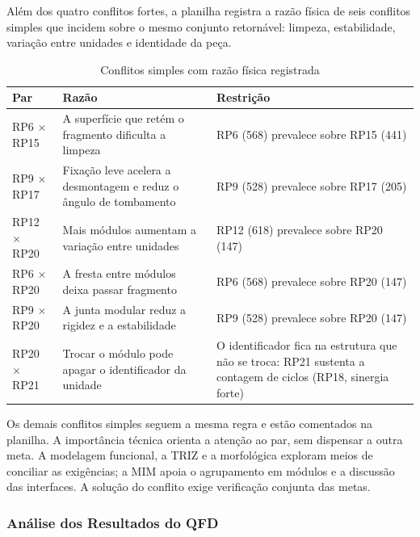 Além dos quatro conflitos fortes, a planilha registra a razão física de seis conflitos simples que incidem sobre o mesmo conjunto retornável: limpeza, estabilidade, variação entre unidades e identidade da peça.


\begin{table}[H]
\caption{Conflitos simples com razão física registrada}
\label{tab:conflitos-simples}
\centering
\footnotesize
\begin{tabularx}{\textwidth}{@{}L{2.5cm}@{\hspace{0.25cm}}Y@{\hspace{0.25cm}}L{4.4cm}@{}}
\toprule
\textbf{Par} & \textbf{Razão} & \textbf{Restrição} \\
\midrule
RP6 $\times$ RP15 & A superfície que retém o fragmento dificulta a limpeza & RP6 (568) prevalece sobre RP15 (441) \\
RP9 $\times$ RP17 & Fixação leve acelera a desmontagem e reduz o ângulo de tombamento & RP9 (528) prevalece sobre RP17 (205) \\
RP12 $\times$ RP20 & Mais módulos aumentam a variação entre unidades & RP12 (618) prevalece sobre RP20 (147) \\
RP6 $\times$ RP20 & A fresta entre módulos deixa passar fragmento & RP6 (568) prevalece sobre RP20 (147) \\
RP9 $\times$ RP20 & A junta modular reduz a rigidez e a estabilidade & RP9 (528) prevalece sobre RP20 (147) \\
RP20 $\times$ RP21 & Trocar o módulo pode apagar o identificador da unidade & O identificador fica na estrutura que não se troca: RP21 sustenta a contagem de ciclos (RP18, sinergia forte) \\
\bottomrule
\end{tabularx}
\end{table}

\noindent Os demais conflitos simples seguem a mesma regra e estão comentados na planilha. A importância técnica orienta a atenção ao par, sem dispensar a outra meta. A modelagem funcional, a TRIZ e a morfológica exploram meios de conciliar as exigências; a MIM apoia o agrupamento em módulos e a discussão das interfaces. A solução do conflito exige verificação conjunta das metas.

\subsubsection{Análise dos Resultados do QFD}

